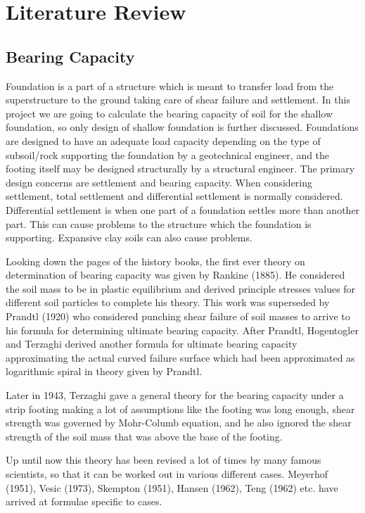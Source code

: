 \chapter{Literature Review}
\section{Bearing Capacity}
Foundation is a part of a structure which is meant to transfer load from the superstructure to the ground taking care of shear failure and settlement. In this project we are going to calculate the bearing capacity of soil for the shallow foundation, so only design of shallow foundation is further discussed. Foundations are designed to have an adequate load capacity depending on the type of subsoil/rock supporting the foundation by a geotechnical engineer, and the footing itself may be designed structurally by a structural engineer. The primary design concerns are settlement and bearing capacity. When considering settlement, total settlement and differential settlement is normally considered. Differential settlement is when one part of a foundation settles more than another part. This can cause problems to the structure which the foundation is supporting. Expansive clay soils can also cause problems.

Looking down the pages of the history books, the first ever theory on determination of bearing capacity was given by Rankine (1885). He considered the soil mass to be in plastic equilibrium and derived principle stresses values for different soil particles to complete his theory. This work was superseded by Prandtl (1920) who considered punching shear failure of soil masses to arrive to his formula for determining ultimate bearing capacity. After Prandtl, Hogentogler and Terzaghi derived another formula for ultimate bearing capacity approximating the actual curved failure surface which had been approximated as logarithmic spiral in theory given by Prandtl.\cite{arora_soil_2004}
\par
Later in 1943, Terzaghi gave a general theory for the bearing capacity under a strip footing making a lot of assumptions like the footing was long enough, shear strength was governed by Mohr-Columb equation, and he also ignored the shear strength of the soil mass that was above the base of the footing.\cite{arora_soil_2004}
\par
Up until now this theory has been revised a lot of times by many famous scientists, so that it can be worked out in various different cases. Meyerhof (1951), Vesic (1973), Skempton (1951), Hansen (1962), Teng (1962) etc. have arrived at formulae specific to cases.\cite{arora_soil_2004}
\par

